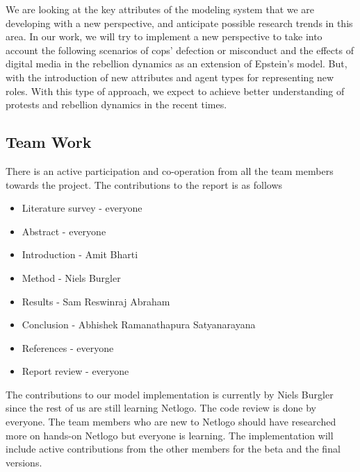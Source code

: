 \documentclass[a4paper,11pt]{article}
\begin{document}
We are looking at the key attributes of the modeling system that we are developing with a new perspective, and anticipate possible research trends in this area. In our work, we will try to implement a new perspective to take into account the following scenarios of cops' defection or misconduct and the effects of digital media in the rebellion dynamics as an extension of Epstein's model. But, with the introduction of new attributes and agent types for representing new roles. With this type of approach, we expect to achieve better understanding of protests and rebellion dynamics in the recent times.

\subsection{Team Work}

There is an active participation and co-operation from all the team members towards the project. The contributions to the report is as follows
\begin{itemize}
    \item Literature survey - everyone
    \item Abstract - everyone
    \item Introduction - Amit Bharti
    \item Method - Niels Burgler
    \item Results - Sam Reswinraj Abraham
    \item Conclusion - Abhishek Ramanathapura Satyanarayana
    \item References - everyone
    \item Report review - everyone
\end{itemize}

The contributions to our model implementation is currently by Niels Burgler since the rest of us are still learning Netlogo. The code review is done by everyone. The team members who are new to Netlogo should have researched more on hands-on Netlogo but everyone is learning. The implementation will include active contributions from the other members for the beta and the final versions.

\printbibliography
\end{document}
